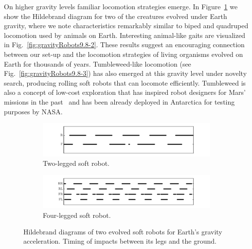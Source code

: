 \documentclass{sig-alternate}
\begin{document}
On higher gravity levels familiar locomotion strategies emerge. In Figure~\ref{fig:hildebrand} we show the Hildebrand diagram for two of the creatures evolved under Earth gravity, where we note characteristics remarkably similar to biped and quadruped locomotion used by animals on Earth. Interesting animal-like gaits are visualized in Fig.~\ref{fig:gravityRobots9.8-2}. These results suggest an encouraging connection between our set-up and the locomotion strategies of living organisms evolved on Earth for thousands of years. Tumbleweed-like locomotion (see Fig.~\ref{fig:gravityRobots9.8-3}) has also emerged at this gravity level under novelty search, producing rolling soft robots that can locomote efficiently. 
Tumbleweed is also a concept of low-cost exploration that has inspired robot designers for Mars' missions in the past~\cite{antol2003low} and has been already deployed in Antarctica for testing purposes by NASA.

\begin{figure}[t!]
\vspace{.5cm}
\centering
\begin{subfigure}[b]{0.5\textwidth}
\centering
\includegraphics[width=1.0\textwidth]{../Figures/Results/hildebrand1.pdf}
\caption{Two-legged soft robot.}
\vspace{.63cm}
\end{subfigure}
\begin{subfigure}[b]{0.5\textwidth}
\centering
\includegraphics[width=1.0\textwidth]{../Figures/Results/hildebrand2.pdf}
\caption{Four-legged soft robot.}
\vspace{.62cm}
\end{subfigure}
\caption{Hildebrand diagrams of two evolved soft robots for Earth's gravity acceleration. Timing of impacts between its legs and the ground.}
\label{fig:hildebrand}
\end{figure}
\end{document}
